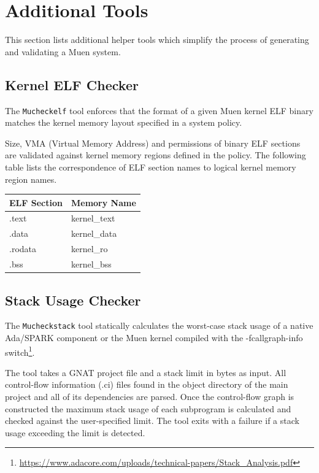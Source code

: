 \documentclass[a4paper,twoside,titlepage]{article}
\begin{document}
\section{Additional Tools}
\label{sec:addtools}

This section lists additional helper tools which simplify the process of
generating and validating a Muen system.

\subsection{Kernel ELF Checker}
\label{sec:mucheckelf}
The \texttt{Mucheckelf} tool enforces that the format of a given Muen kernel
ELF binary matches the kernel memory layout specified in a system policy.

Size, VMA (Virtual Memory Address) and permissions of binary ELF sections are
validated against kernel memory regions defined in the policy. The following
table lists the correspondence of ELF section names to logical kernel memory
region names.

\begin{table}[h]
	\centering
	\begin{tabular}{l|l}
		\textbf{ELF Section} & \textbf{Memory Name} \\
		\hline
		.text   & kernel\_text \\
		.data   & kernel\_data \\
		.rodata & kernel\_ro   \\
		.bss    & kernel\_bss  \\
		\hline
	\end{tabular}
\end{table}

\subsection{Stack Usage Checker}
\label{sec:mucheckstack}
The \texttt{Mucheckstack} tool statically calculates the worst-case stack usage
of a native Ada/SPARK component or the Muen kernel compiled with the
-fcallgraph-info
switch\footnote{\url{https://www.adacore.com/uploads/technical-papers/Stack\_Analysis.pdf}}.

The tool takes a GNAT project file and a stack limit in bytes as input.  All
control-flow information (.ci) files found in the object directory of the main
project and all of its dependencies are parsed. Once the control-flow graph is
constructed the maximum stack usage of each subprogram is calculated and
checked against the user-specified limit. The tool exits with a failure if a
stack usage exceeding the limit is detected.
\end{document}

